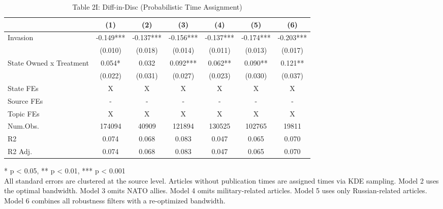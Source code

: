 \begin{table}[!t]
\caption{Table 2I: Diff-in-Disc (Probabilistic Time Assignment)} 
\fontsize{12.0pt}{14.4pt}\selectfont
\begin{tabular*}{\linewidth}{@{\extracolsep{\fill}}lcccccc}
\toprule
  & (1) & (2) & (3) & (4) & (5) & (6) \\ 
\midrule\addlinespace[2.5pt]
Invasion & -0.149*** & -0.137*** & -0.156*** & -0.137*** & -0.174*** & -0.203*** \\ 
 & (0.010) & (0.018) & (0.014) & (0.011) & (0.013) & (0.017) \\ 
State Owned x Treatment & 0.054* & 0.032 & 0.092*** & 0.062** & 0.090** & 0.121** \\ 
{} & {(0.022)} & {(0.031)} & {(0.027)} & {(0.023)} & {(0.030)} & {(0.037)} \\ 
State FEs & X & X & X & X & X & X \\ 
Source FEs & - & - & - & - & - & - \\ 
Topic FEs & X & X & X & X & X & X \\ 
Num.Obs. & 174094 & 40909 & 121894 & 130525 & 102765 & 19811 \\ 
R2 & 0.074 & 0.068 & 0.083 & 0.047 & 0.065 & 0.070 \\ 
R2 Adj. & 0.074 & 0.068 & 0.083 & 0.047 & 0.065 & 0.070 \\ 
\bottomrule
\end{tabular*}
\begin{minipage}{\linewidth}
* p < 0.05, ** p < 0.01, *** p < 0.001\\
All standard errors are clustered at the source level. Articles without
publication times are assigned times via KDE sampling. Model 2 uses the optimal
bandwidth. Model 3 omits NATO allies. Model 4 omits military-related articles.
Model 5 uses only Russian-related articles. Model 6 combines all robustness
filters with a re-optimized bandwidth.\\
\end{minipage}
\end{table}

